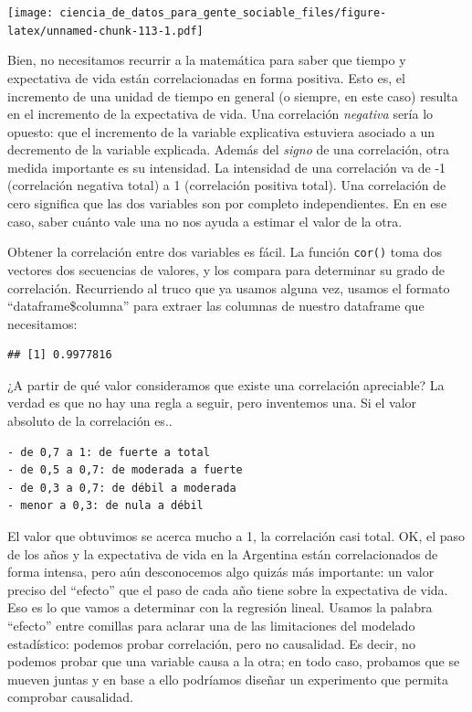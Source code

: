\documentclass[]{book}
\newenvironment{Shaded}{\begin{snugshade}}{\end{snugshade}}
\newcommand{\KeywordTok}[1]{\textcolor[rgb]{0.13,0.29,0.53}{\textbf{#1}}}
\newcommand{\OperatorTok}[1]{\textcolor[rgb]{0.81,0.36,0.00}{\textbf{#1}}}
\newcommand{\NormalTok}[1]{#1}
\begin{document}
\texttt{[image: ciencia\_de\_datos\_para\_gente\_sociable\_files/figure-latex/unnamed-chunk-113-1.pdf]}

Bien, no necesitamos recurrir a la matemática para saber que tiempo y
expectativa de vida están correlacionadas en forma positiva. Esto es, el
incremento de una unidad de tiempo en general (o siempre, en este caso)
resulta en el incremento de la expectativa de vida. Una correlación
\emph{negativa} sería lo opuesto: que el incremento de la variable
explicativa estuviera asociado a un decremento de la variable explicada.
Además del \emph{signo} de una correlación, otra medida importante es su
intensidad. La intensidad de una correlación va de -1 (correlación
negativa total) a 1 (correlación positiva total). Una correlación de
cero significa que las dos variables son por completo independientes. En
en ese caso, saber cuánto vale una no nos ayuda a estimar el valor de la
otra.

Obtener la correlación entre dos variables es fácil. La función
\texttt{cor()} toma dos vectores dos secuencias de valores, y los
compara para determinar su grado de correlación. Recurriendo al truco
que ya usamos alguna vez, usamos el formato ``dataframe\$columna'' para
extraer las columnas de nuestro dataframe que necesitamos:

\begin{Shaded}
\end{Shaded}

\begin{verbatim}
## [1] 0.9977816
\end{verbatim}

¿A partir de qué valor consideramos que existe una correlación
apreciable? La verdad es que no hay una regla a seguir, pero inventemos
una. Si el valor absoluto de la correlación es..

\begin{verbatim}
- de 0,7 a 1: de fuerte a total
- de 0,5 a 0,7: de moderada a fuerte
- de 0,3 a 0,7: de débil a moderada
- menor a 0,3: de nula a débil
\end{verbatim}

El valor que obtuvimos se acerca mucho a 1, la correlación casi total.
OK, el paso de los años y la expectativa de vida en la Argentina están
correlacionados de forma intensa, pero aún desconocemos algo quizás más
importante: un valor preciso del ``efecto'' que el paso de cada año
tiene sobre la expectativa de vida. Eso es lo que vamos a determinar con
la regresión lineal. Usamos la palabra ``efecto'' entre comillas para
aclarar una de las limitaciones del modelado estadístico: podemos probar
correlación, pero no causalidad. Es decir, no podemos probar que una
variable causa a la otra; en todo caso, probamos que se mueven juntas y
en base a ello podríamos diseñar un experimento que permita comprobar
causalidad.
\end{document}
